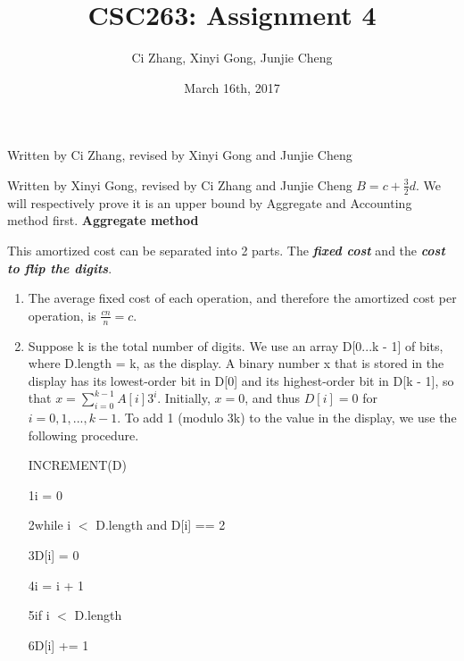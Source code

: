 \documentclass[11pt, answers]{exam}
\theoremstyle{plain}
\theoremstyle{definition}
\begin{document}
 


\title{CSC263: Assignment 4}
\date{March 16th, 2017}
\author{Ci Zhang, Xinyi Gong, Junjie Cheng}
\maketitle

\unframedsolutions

\begin{questions}
\question
\begin{solution}Written by Ci Zhang, revised by Xinyi Gong and Junjie Cheng


\end{solution}

\question
\begin{solution}Written by Xinyi Gong, revised by Ci Zhang and Junjie Cheng
$B = c + {\frac{3}{2}}d$. \newline
We will respectively prove it is an upper bound by Aggregate and Accounting method first.\newline
\newline
\textbf{Aggregate method}

This amortized cost can be separated into 2 parts. The \textbf{\emph{fixed cost}} and the \textbf{\emph{cost to flip the digits}}.

\begin{enumerate}

\item
The average fixed cost of each operation, and therefore the amortized cost per operation, is $\frac{cn}{n} = c$.
\item
Suppose k is the total number of digits. 
We use an array D[0...k - 1] of bits, where D.length = k, as the display. A binary number x that is stored in the display has its lowest-order bit in D[0] and its highest-order bit in D[k - 1], so that $x = \sum_{i=0}^{k-1} A[i]3^i$. Initially, $x = 0$, and thus $D[i] = 0$ for $i = 0, 1,..., k - 1$. To add 1 (modulo 3k) to the value in the display, we use the following procedure.

INCREMENT(D)

1\qquad i = 0

2\qquad while i $<$ D.length and D[i] == 2

3\qquad\qquad D[i] = 0

4\qquad\qquad i = i + 1

5\qquad if i $<$ D.length

6\qquad\qquad D[i] += 1


\end{enumerate}
\end{solution}
\end{questions}
\end{document}
